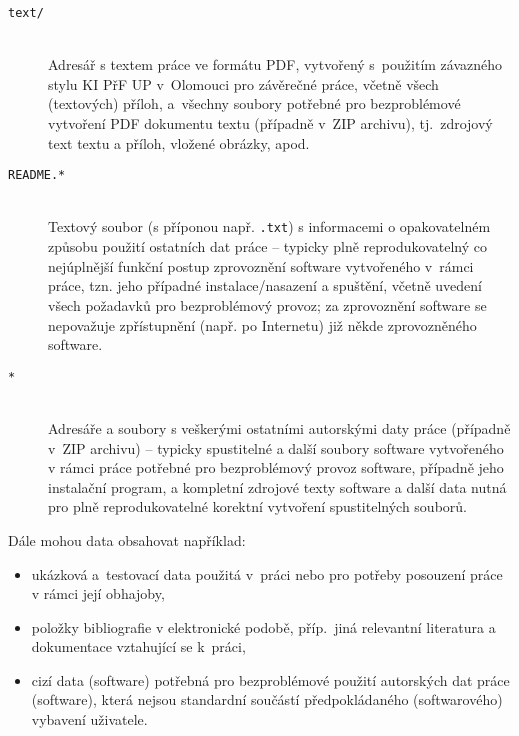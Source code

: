 \documentclass[
  master,
  program=ainfvs,
  biblatex,
  figures=false,
  glossaries,
  index
]{kidiplom}
\begin{document}
\begin{description}

\item[\texttt{text/}] \hfill \\
  Adresář s textem práce ve formátu PDF, vytvořený s~použitím
  závazného stylu KI PřF UP v~Olomouci pro závěrečné práce, včetně
  všech (textových) příloh, a~všechny soubory potřebné pro
  bezproblémové vytvoření PDF dokumentu textu (případně v~ZIP
  archivu), tj.~zdrojový text textu a příloh, vložené obrázky, apod.

\item[\texttt{README.*}] \hfill \\
  Textový soubor (s příponou např. \texttt{.txt}) s informacemi o
  opakovatelném způsobu použití ostatních dat práce -- typicky plně
  reprodukovatelný co nejúplnější funkční postup zprovoznění software
  vytvořeného v~rámci práce, tzn. jeho případné instalace/nasazení a
  spuštění, včetně uvedení všech požadavků pro bezproblémový provoz;
  za zprovoznění software se nepovažuje zpřístupnění (např. po
  Internetu) již někde zprovozněného software.

\item[\texttt{*}] \hfill \\
  Adresáře a soubory s veškerými ostatními autorskými daty práce
  (případně v~ZIP archivu) -- typicky spustitelné a další soubory
  software vytvořeného v rámci práce potřebné pro bezproblémový provoz
  software, případně jeho instalační program, a kompletní zdrojové
  texty software a další data nutná pro plně reprodukovatelné korektní
  vytvoření spustitelných souborů.

\end{description}

Dále mohou data obsahovat například:

\begin{itemize}

\item
  ukázková a~testovací data použitá v~práci nebo pro potřeby posouzení
  práce v rámci její obhajoby,

\item
  položky bibliografie v elektronické podobě, příp.~jiná relevantní literatura
  a dokumentace vztahující se k~práci,

\item
  cizí data (software) potřebná pro bezproblémové použití autorských
  dat práce (software), která nejsou standardní součástí
  předpokládaného (softwarového) vybavení uživatele.

\end{itemize}
\end{document}
